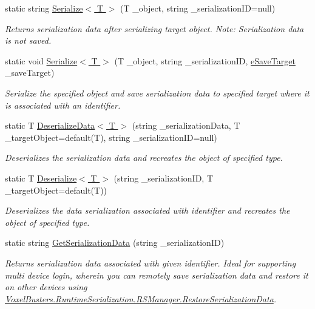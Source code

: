 \begin{DoxyCompactItemize}
\item 
static string \hyperlink{class_voxel_busters_1_1_runtime_serialization_1_1_r_s_manager_ab6530217efdcb8d99bf7d3044f2b8561}{Serialize$<$ T $>$} (T \+\_\+object, string \+\_\+serialization\+I\+D=null)
\begin{DoxyCompactList}\small\item\em Returns serialization data after serializing target object. Note\+: Serialization data is not saved. \end{DoxyCompactList}\item 
static void \hyperlink{class_voxel_busters_1_1_runtime_serialization_1_1_r_s_manager_a49a845ef8799d3cb183a51011e5aee88}{Serialize$<$ T $>$} (T \+\_\+object, string \+\_\+serialization\+I\+D, \hyperlink{namespace_voxel_busters_1_1_runtime_serialization_aacaa3008b2cb441fbe4708df854019bf}{e\+Save\+Target} \+\_\+save\+Target)
\begin{DoxyCompactList}\small\item\em Serialize the specified object and save serialization data to specified target where it is associated with an identifier. \end{DoxyCompactList}\item 
static T \hyperlink{class_voxel_busters_1_1_runtime_serialization_1_1_r_s_manager_a862f53c7275407d42b1c1e282cdc7d48}{Deserialize\+Data$<$ T $>$} (string \+\_\+serialization\+Data, T \+\_\+target\+Object=default(T), string \+\_\+serialization\+I\+D=null)
\begin{DoxyCompactList}\small\item\em Deserializes the serialization data and recreates the object of specified type. \end{DoxyCompactList}\item 
static T \hyperlink{class_voxel_busters_1_1_runtime_serialization_1_1_r_s_manager_a38aa7a063cb3ac84eed6f198d5654fdb}{Deserialize$<$ T $>$} (string \+\_\+serialization\+I\+D, T \+\_\+target\+Object=default(T))
\begin{DoxyCompactList}\small\item\em Deserializes the data serialization associated with identifier and recreates the object of specified type. \end{DoxyCompactList}\item 
static string \hyperlink{class_voxel_busters_1_1_runtime_serialization_1_1_r_s_manager_a75d7bd13b5eb98362397280ef2744862}{Get\+Serialization\+Data} (string \+\_\+serialization\+I\+D)
\begin{DoxyCompactList}\small\item\em Returns serialization data associated with given identifier. Ideal for supporting multi device login, wherein you can remotely save serialization data and restore it on other devices using \hyperlink{class_voxel_busters_1_1_runtime_serialization_1_1_r_s_manager_a9c0963c7dad73a4331c53ec8937c889c}{Voxel\+Busters.\+Runtime\+Serialization.\+R\+S\+Manager.\+Restore\+Serialization\+Data}. \end{DoxyCompactList}\item 

\end{DoxyCompactItemize}
